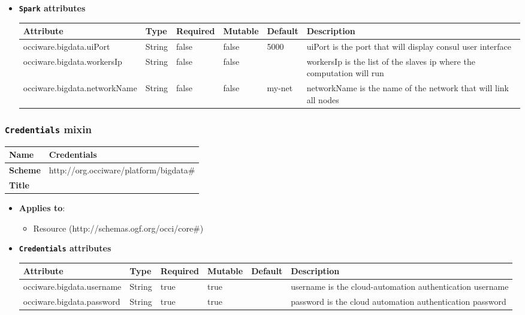 \begin{itemize}
\item \textbf{\texttt{Spark} attributes}

\begin{tabularx}{\textwidth}{|l|l|p{1.4cm}|p{1.3cm}|l|X|}
  \hline
  \textbf{Attribute} & \textbf{Type} & \textbf{Required} & \textbf{Mutable} & \textbf{Default} & \textbf{Description} \\
  \hline  
  occiware.bigdata.uiPort & String & false & false & 5000 & uiPort is the port that will display consul user interface \\
  \hline
  occiware.bigdata.workersIp & String & false & false &  & workersIp is the list of the slaves ip where the computation will run \\
  \hline
  occiware.bigdata.networkName & String & false & false & my-net & networkName is the name of the network that will link all nodes \\
  \hline
\end{tabularx}
\end{itemize}


 
\subsubsection{\texttt{Credentials} mixin}
\begin{center}
\begin{tabular}{|l|l|}
  \hline
  \textbf{Name} & Credentials \\
  \hline  
  \textbf{Scheme} & http://org.occiware/platform/bigdata\# \\
  \hline
  \textbf{Title} &  \\
  \hline
\end{tabular}
\end{center}
\begin{itemize}
\item \textbf{Applies to}:
\begin{itemize}
	\item Resource (http://schemas.ogf.org/occi/core\#)
\end{itemize}
\end{itemize} 

\begin{itemize}
\item \textbf{\texttt{Credentials} attributes}

\begin{tabularx}{\textwidth}{|l|l|p{1.4cm}|p{1.3cm}|l|X|}
  \hline
  \textbf{Attribute} & \textbf{Type} & \textbf{Required} & \textbf{Mutable} & \textbf{Default} & \textbf{Description} \\
  \hline  
  occiware.bigdata.username & String & true & true &  & username is the cloud-automation authentication username \\
  \hline
  occiware.bigdata.password & String & true & true &  & password is the cloud automation authentication password \\
  \hline
\end{tabularx}
\end{itemize}


 
